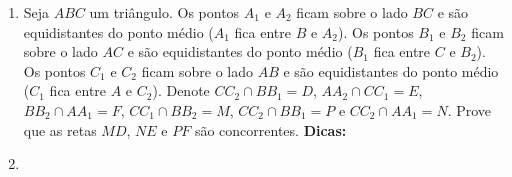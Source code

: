 \documentclass{article}
\newcommand{\dica}{\textbf{Dicas:}}
\newcommand{\iniTri}{Seja $ABC$ um triângulo}
\begin{document}
\begin{multicols}{2}
\begin{enumerate}
    \item \iniTri. Os pontos $A_1$ e $A_2$ ficam sobre o lado $BC$ e são equidistantes do ponto médio ($A_1$ fica entre $B$ e $A_2$). Os pontos $B_1$ e $B_2$ ficam sobre o lado $AC$ e são equidistantes do ponto médio ($B_1$ fica entre $C$ e $B_2$). Os pontos $C_1$ e $C_2$ ficam sobre o lado $AB$ e são equidistantes do ponto médio ($C_1$ fica entre $A$ e $C_2$). Denote $CC_2\cap BB_1=D$, $AA_2\cap CC_1=E$, $BB_2\cap AA_1=F$, $CC_1\cap BB_2=M$, $CC_2\cap BB_1=P$ e $CC_2\cap AA_1=N$. Prove que as retas $MD$, $NE$ e $PF$ são concorrentes. \dica %
    
    \item 
    
    
    
    
    
    
    
    
    
\end{enumerate}
\end{multicols}
\end{document}
